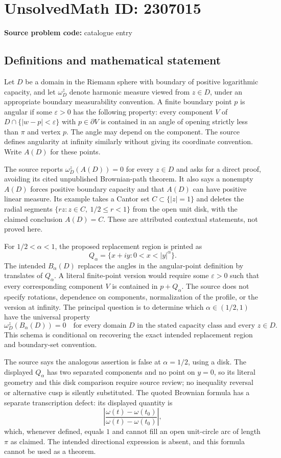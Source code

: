 \documentclass[11pt]{article}
\newcommand{\eps}{\varepsilon}
\begin{document}
\section*{UnsolvedMath ID: 2307015}
\textbf{Source problem code:} catalogue entry
\subsection{Definitions and mathematical statement}
Let $D$ be a domain in the Riemann sphere with boundary of positive logarithmic capacity, and let $\omega_D^z$ denote harmonic measure viewed from $z\in D$, under an appropriate boundary measurability convention. A finite boundary point $p$ is angular if some $\eps>0$ has the following property: every component $V$ of $D\cap\{|w-p|<\eps\}$ with $p\in\partial V$ is contained in an angle of opening strictly less than $\pi$ and vertex $p$. The angle may depend on the component. The source defines angularity at infinity similarly without giving its coordinate convention. Write $A(D)$ for these points.

The source reports $\omega_D^z(A(D))=0$ for every $z\in D$ and asks for a direct proof, avoiding its cited unpublished Brownian-path theorem. It also says a nonempty $A(D)$ forces positive boundary capacity and that $A(D)$ can have positive linear measure. Its example takes a Cantor set $C\subset\{|z|=1\}$ and deletes the radial segments $\{rz:z\in C,\ 1/2\le r<1\}$ from the open unit disk, with the claimed conclusion $A(D)=C$. These are attributed contextual statements, not proved here.

For $1/2<\alpha<1$, the proposed replacement region is printed as
\[
Q_\alpha=\{x+iy:0<x<|y|^\alpha\}.
\]
The intended $B_\alpha(D)$ replaces the angles in the angular-point definition by translates of $Q_\alpha$. A literal finite-point version would require some $\eps>0$ such that every corresponding component $V$ is contained in $p+Q_\alpha$. The source does not specify rotations, dependence on components, normalization of the profile, or the version at infinity. The principal question is to determine which $\alpha\in(1/2,1)$ have the universal property
\[
\omega_D^z(B_\alpha(D))=0
\quad\text{for every domain }D\text{ in the stated capacity class and every }z\in D.
\]
This schema is conditional on recovering the exact intended replacement region and boundary-set convention.

The source says the analogous assertion is false at $\alpha=1/2$, using a disk. The displayed $Q_\alpha$ has two separated components and no point on $y=0$, so its literal geometry and this disk comparison require source review; no inequality reversal or alternative cusp is silently substituted. The quoted Brownian formula has a separate transcription defect: its displayed quantity is
\[
\left|\frac{\omega(t)-\omega(t_0)}{\omega(t)-\omega(t_0)}\right|,
\]
which, whenever defined, equals $1$ and cannot fill an open unit-circle arc of length $\pi$ as claimed. The intended directional expression is absent, and this formula cannot be used as a theorem.
\end{document}
